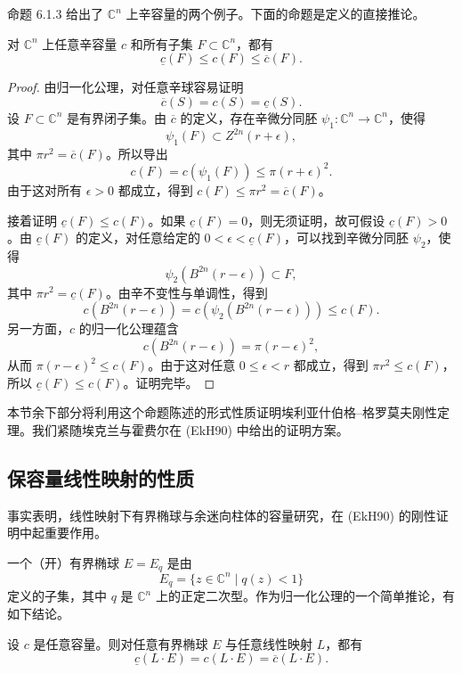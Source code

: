 命题 6.1.3 给出了 $\mathbb C^n$ 上辛容量的两个例子。下面的命题是定义的直接推论。

\begin{proposition}\label{prop:capacity-extremal-bounds}
对 $\mathbb C^n$ 上任意辛容量 $c$ 和所有子集
$F\subset\mathbb C^n$，都有
\[
 \underline c(F)\leq c(F)\leq\overline c(F).
\]
\end{proposition}

\begin{proof}
由归一化公理，对任意辛球容易证明
\begin{equation}
 \overline c(S)=c(S)=\underline c(S).
 \label{eq:capacities-agree-on-balls}
\end{equation}
设 $F\subset\mathbb C^n$ 是有界闭子集。由 $\overline c$ 的定义，存在辛微分同胚
$\psi_1:\mathbb C^n\to\mathbb C^n$，使得
\[
 \psi_1(F)\subset Z^{2n}(r+\epsilon),
\]
其中 $\pi r^2=\overline c(F)$。所以导出
\[
 c(F)=c(\psi_1(F))\leq\pi(r+\epsilon)^2.
\]
由于这对所有 $\epsilon>0$ 都成立，得到
$c(F)\leq\pi r^2=\overline c(F)$。

接着证明 $\underline c(F)\leq c(F)$。如果 $\underline c(F)=0$，则无须证明，故可假设 $\underline c(F)>0$。由 $\underline c(F)$ 的定义，对任意给定的
$0<\epsilon<\underline c(F)$，可以找到辛微分同胚 $\psi_2$，使得
\[
 \psi_2(B^{2n}(r-\epsilon))\subset F,
\]
其中 $\pi r^2=\underline c(F)$。由辛不变性与单调性，得到
\[
 c(B^{2n}(r-\epsilon))
 =c(\psi_2(B^{2n}(r-\epsilon)))\leq c(F).
\]
另一方面，$c$ 的归一化公理蕴含
\[
 c(B^{2n}(r-\epsilon))=\pi(r-\epsilon)^2,
\]
从而 $\pi(r-\epsilon)^2\leq c(F)$。由于这对任意
$0\leq\epsilon<r$ 都成立，得到 $\pi r^2\leq c(F)$，所以
$\underline c(F)\leq c(F)$。证明完毕。
\end{proof}

本节余下部分将利用这个命题陈述的形式性质证明埃利亚什伯格--格罗莫夫刚性定理。我们紧随埃克兰与霍费尔在 (EkH90) 中给出的证明方案。

\subsection{保容量线性映射的性质}
\label{subsec:capacity-preserving-linear-maps}

事实表明，线性映射下有界椭球与余迷向柱体的容量研究，在 (EkH90) 的刚性证明中起重要作用。

一个（开）有界椭球 $E=E_q$ 是由
\[
 E_q=\{z\in\mathbb C^n\mid q(z)<1\}
\]
定义的子集，其中 $q$ 是 $\mathbb C^n$ 上的正定二次型。作为归一化公理的一个简单推论，有如下结论。

\begin{proposition}\label{prop:capacities-linear-ellipsoid}
设 $c$ 是任意容量。则对任意有界椭球 $E$ 与任意线性映射 $L$，都有
\[
 \underline c(L\cdot E)=c(L\cdot E)=\overline c(L\cdot E).
\]
\end{proposition}

